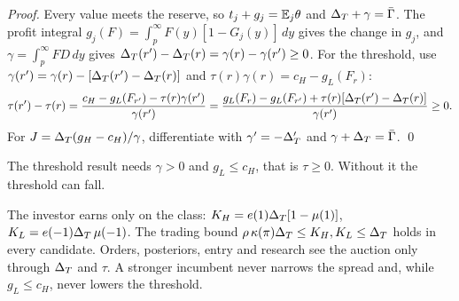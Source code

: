\emph{Proof.} Every value meets the reserve, so \(t_j+g_j=\mathbb{E}_j\theta\) and \(\Delta_T+\gamma=\bar\Gamma\). The profit integral \(g_j(F)=\int_p^\infty F(y)[1-G_j(y)]\,dy\) gives the change in \(g_j\), and
\(\gamma=\int_p^\infty F D\,dy\) gives \(\Delta_T(r')-\Delta_T(r)=\gamma(r)-\gamma(r')\ge0\). For the threshold, use
\(\gamma(r')=\gamma(r)-[\Delta_T(r')-\Delta_T(r)]\) and \(\tau(r)\gamma(r)=c_H-g_L(F_r)\):
\begin{align*}
\tau(r')-\tau(r)=\frac{c_H-g_L(F_{r'})-\tau(r)\gamma(r')}{\gamma(r')}
=\frac{g_L(F_r)-g_L(F_{r'})+\tau(r)[\Delta_T(r')-\Delta_T(r)]}{\gamma(r')}\ge0 .
\end{align*}
For \(J=\Delta_T(g_H-c_H)/\gamma\), differentiate with \(\gamma'=-\Delta_T'\) and \(\gamma+\Delta_T=\bar\Gamma\). \qed

\begin{watchout}
The threshold result needs \(\gamma>0\) and \(g_L\le c_H\), that is \(\tau\ge0\). Without it the threshold can fall.
\end{watchout}


\begin{chaptersummary}
The investor earns only on the class: \(K_H=e(1)\Delta_T[1-\mu(1)]\), \(K_L=e(-1)\Delta_T\,\mu(-1)\). The trading bound \(\rho\,\kappa(\pi)\Delta_T\le K_H,K_L\le\Delta_T\) holds in every candidate.
Orders, posteriors, entry and research see the auction only through \(\Delta_T\) and \(\tau\). A stronger incumbent
never narrows the spread and, while \(g_L\le c_H\), never lowers the threshold.
\end{chaptersummary}
